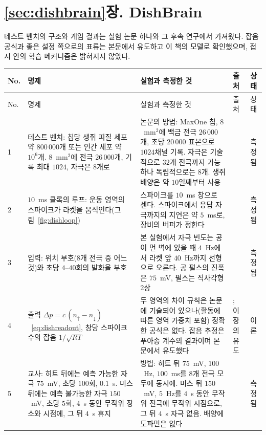 \section{\ref{sec:dishbrain}장. DishBrain}

테스트 벤치의 구조와 게임 결과는 실험 논문 하나와 그 후속 연구에서 가져왔다. 잡음 공식과 좋은 설정 쪽으로의 표류는 본문에서 유도하고 이 책의 모델로 확인했으며, 접시 안의 학습 메커니즘은 밝혀지지 않았다.

{\footnotesize
\setlength{\tabcolsep}{3pt}\renewcommand{\arraystretch}{1.15}
\begin{longtable}{>{\raggedright}p{0.5cm}>{\raggedright}p{4.0cm}>{\raggedright}p{5.6cm}>{\raggedright}p{2.3cm}>{\raggedright\arraybackslash}p{1.7cm}}
\toprule
No. & 명제 & 실험과 측정한 것 & 출처 & 상태 \\
\midrule\endfirsthead
\toprule
No. & 명제 & 실험과 측정한 것 & 출처 & 상태 \\
\midrule\endhead
1 & 테스트 벤치: 칩당 생쥐 피질 세포 약 $800\,000$개 또는 인간 세포 약 $10^6$개. $8$~mm$^2$에 전극 $26\,000$개, 기록 최대 $1024$, 자극은 $8$개로 & 논문의 방법: MaxOne 칩, $8$~mm$^2$에 백금 전극 $26\,000$개, 초당 $20\,000$ 표본으로 $1024$채널 기록. 자극은 기술적으로 $32$개 전극까지 가능하나 독립적으로는 $8$개. 생쥐 배양은 약 $10$일째부터 사용 & \cite{Kagan2022} & 측정됨 \\
2 & $10$~ms 클록의 루프: 운동 영역의 스파이크가 라켓을 움직인다(그림~\ref{fig:dishloop}) & 스파이크를 $10$~ms 창으로 센다. 스파이크에서 응답 자극까지의 지연은 약 $5$~ms로, 장비의 버퍼가 정한다 & \cite{Kagan2022} & 측정됨 \\
3 & 입력: 위치 부호($8$개 전극 중 어느 것)와 초당 $4$--$40$회의 발화율 부호 & 본 실험에서 자극 빈도는 공이 먼 벽에 있을 때 $4$~Hz에서 라켓 앞 $40$~Hz까지 선형으로 오른다. 공 펄스의 진폭은 $75$~mV, 펄스는 직사각형 2상 & \cite{Kagan2022} & 측정됨 \\
4 & 출력 $\Delta p=c\,(n_\uparrow-n_\downarrow)$~\eqref{eq:dishreadout}, 창당 스파이크 수의 잡음 $1/\sqrt{RT}$ & 두 영역의 차이 규칙은 논문에 기술되어 있으나(활동에 따른 영역 가중치 포함) 정확한 공식은 없다. 잡음 추정은 푸아송 계수의 결과이며 본문에서 유도했다 & \cite{Kagan2022}; 이 장의 유도 & 이론 \\
5 & 교사: 히트 뒤에는 예측 가능한 자극 $75$~mV, 초당 $100$회, $0.1$~s. 미스 뒤에는 예측 불가능한 자극 $150$~mV, 초당 $5$회, $4$~s 동안 무작위 장소와 시점에, 그 뒤 $4$~s 휴지 & 방법: 히트 뒤 $75$~mV, $100$~Hz, $100$~ms를 $8$개 전극 모두에 동시에. 미스 뒤 $150$~mV, $5$~Hz를 $4$~s 동안 무작위 전극에 무작위 시점으로, 그 뒤 $4$~s 자극 없음. 배양에 도파민은 없다 & \cite{Kagan2022} & 측정됨 \\

\end{longtable}}
